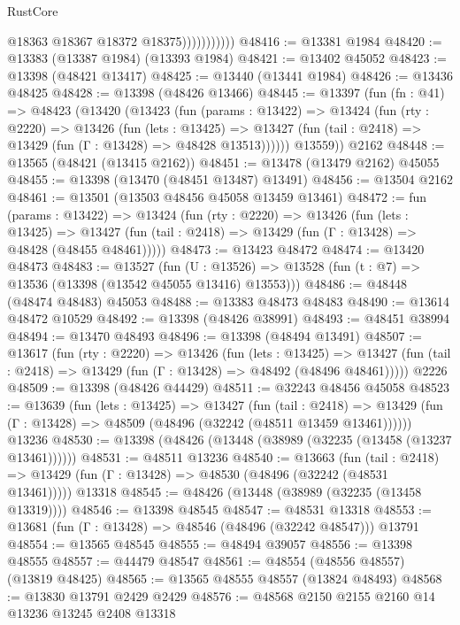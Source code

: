 \begin{lexlean}{RustCore}
\begin{coremodule}
                          @18363
                          @18367
                          @18372
                          @18375)))))))))))
@48416 := @13381 @1984
@48420 := @13383 (@13387 @1984) (@13393 @1984)
@48421 := @13402 @45052
@48423 := @13398 (@48421 @13417)
@48425 := @13440 (@13441 @1984)
@48426 := @13436 @48425
@48428 := @13398 (@48426 @13466)
@48445 := @13397
    (fun (fn : @41) =>
    @48423
      (@13420
        (@13423
          (fun (params : @13422) =>
          @13424
            (fun (rty : @2220) =>
            @13426
              (fun (lets : @13425) =>
              @13427 (fun (tail : @2418) => @13429 (fun (Γ : @13428) => @48428 @13513))))))
        @13559))
    @2162
@48448 := @13565 (@48421 (@13415 @2162))
@48451 := @13478 (@13479 @2162) @45055
@48455 := @13398 (@13470 (@48451 @13487) @13491)
@48456 := @13504 @2162
@48461 := @13501 (@13503 @48456 @45058 @13459 @13461)
@48472 := fun (params : @13422) =>
  @13424
    (fun (rty : @2220) =>
    @13426
      (fun (lets : @13425) =>
      @13427 (fun (tail : @2418) => @13429 (fun (Γ : @13428) => @48428 (@48455 @48461)))))
@48473 := @13423 @48472
@48474 := @13420 @48473
@48483 := @13527
    (fun (U : @13526) => @13528 (fun (t : @7) => @13536 (@13398 (@13542 @45055 @13416) @13553)))
@48486 := @48448 (@48474 @48483) @45053
@48488 := @13383 @48473 @48483
@48490 := @13614 @48472 @10529
@48492 := @13398 (@48426 @38991)
@48493 := @48451 @38994
@48494 := @13470 @48493
@48496 := @13398 (@48494 @13491)
@48507 := @13617
    (fun (rty : @2220) =>
    @13426
      (fun (lets : @13425) =>
      @13427 (fun (tail : @2418) => @13429 (fun (Γ : @13428) => @48492 (@48496 @48461)))))
    @2226
@48509 := @13398 (@48426 @44429)
@48511 := @32243 @48456 @45058
@48523 := @13639
    (fun (lets : @13425) =>
    @13427
      (fun (tail : @2418) =>
      @13429 (fun (Γ : @13428) => @48509 (@48496 (@32242 (@48511 @13459 @13461))))))
    @13236
@48530 := @13398 (@48426 (@13448 (@38989 (@32235 (@13458 (@13237 @13461))))))
@48531 := @48511 @13236
@48540 := @13663
    (fun (tail : @2418) => @13429 (fun (Γ : @13428) => @48530 (@48496 (@32242 (@48531 @13461)))))
    @13318
@48545 := @48426 (@13448 (@38989 (@32235 (@13458 @13319))))
@48546 := @13398 @48545
@48547 := @48531 @13318
@48553 := @13681 (fun (Γ : @13428) => @48546 (@48496 (@32242 @48547))) @13791
@48554 := @13565 @48545
@48555 := @48494 @39057
@48556 := @13398 @48555
@48557 := @44479 @48547
@48561 := @48554 (@48556 @48557) (@13819 @48425)
@48565 := @13565 @48555 @48557 (@13824 @48493)
@48568 := @13830 @13791 @2429 @2429
@48576 := @48568 @2150 @2155 @2160 @14 @13236 @13245 @2408 @13318

\end{coremodule}
\end{lexlean}
